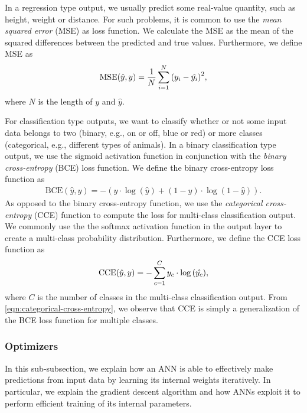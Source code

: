In a regression type output, we usually predict some real-value quantity, such as height, weight or distance. For such problems, it is common to use the \textit{mean squared error} (MSE) as loss function. We calculate the MSE as the mean of the squared differences between the predicted and true values. Furthermore, we define MSE as
\begin{align}
    \label{eqn:mean-squared-error}
    \text{MSE}(\hat{y}, y) = \frac{1}{N} \sum\limits_{i=1}^{N} {\left( y_i - \hat{y_i} \right)}^2,
\end{align}
where $N$ is the length of $y$ and $\hat{y}$.

For classification type outputs, we want to classify whether or not some input data belongs to two (binary, e.g., on or off, blue or red) or more classes (categorical, e.g., different types of animals). In a binary classification type output, we use the sigmoid activation function in conjunction with the \textit{binary cross-entropy} (BCE) loss function. We define the binary cross-entropy loss function as
\begin{align}
    \label{eqn:binary-cross-entropy}
    \text{BCE}(\hat{y}, y) = -\left( y \cdot \log{\left( \hat{y} \right)} + (1 - y) \cdot \log{\left( 1 - \hat{y} \right)} \right).
\end{align}
As opposed to the binary cross-entropy function, we use the \textit{categorical cross-entropy} (CCE) function to compute the loss for multi-class classification output. We commonly use the the softmax activation function in the output layer to create a multi-class probability distribution. Furthermore, we define the CCE loss function as
\begin{align}
    \label{eqn:categorical-cross-entropy}
    \text{CCE}(\hat{y}, y) = -\sum\limits_{c=1}^{C} y_c \cdot \log{\left( \hat{y_c} \right)},
\end{align}
where $C$ is the number of classes in the multi-class classification output. From \cref{eqn:categorical-cross-entropy}, we observe that CCE is simply a generalization of the BCE loss function for multiple classes.

\subsubsection{Optimizers}
\label{sec:ann-optimizers}
In this sub-subsection, we explain how an ANN is able to effectively make predictions from input data by learning its internal weights iteratively. In particular, we explain the gradient descent algorithm and how ANNs exploit it to perform efficient training of its internal parameters.

